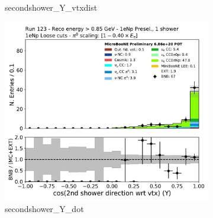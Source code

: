 \begin{figure}[H]
\begin{subfigure}{0.3\textwidth}
    \caption{secondshower\_Y\_vtxdist}
    \end{subfigure}
    \begin{subfigure}{0.3\textwidth}
    \includegraphics[width=1.0\textwidth]{Sidebands/Figures/1eNp/HighEnergy/HiEext_NPOneShr_NPL_pi0e040/secondshower_Y_dot.pdf}
    \caption{secondshower\_Y\_dot}
    \end{subfigure}
    \caption{} 
    \label{fig:HE_1eNp_L_4}
\end{figure}


